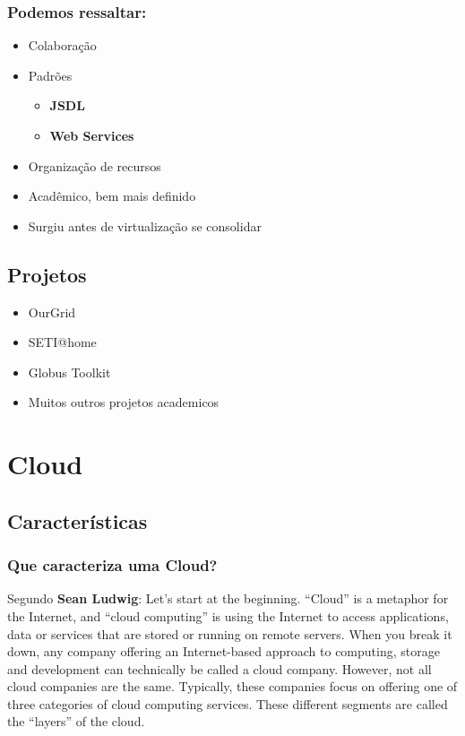\documentclass[10pt]{beamer}
\begin{document}
		\begin{frame}%
		\frametitle{Podemos ressaltar:}
			\begin{itemize}%
				\item Colaboração
				\item Padrões
				\begin{itemize}%
					\item \textbf{JSDL}
					\item \textbf{Web Services}
				\end{itemize}
				\item Organização de recursos
				\item Acadêmico, bem mais definido
				\item Surgiu antes de virtualização se consolidar
			\end{itemize}
		\end{frame}

	\subsection{Projetos}

		\begin{frame}%
			\begin{itemize}%
				\item OurGrid
				\item SETI@home
				\item Globus Toolkit
				\item Muitos outros projetos academicos
			\end{itemize}
		\end{frame}

\section{Cloud}
	\subsection{Características}

		\begin{frame}
		\frametitle{Que caracteriza uma Cloud?}
			\begin{block}{Segundo \textbf{Sean Ludwig}:}
				Let’s start at the beginning. “Cloud” is a metaphor for the Internet, and “cloud computing” is using the Internet to access applications, data or services that are stored or running on remote servers.
\newline
\newline
				When you break it down, any company offering an Internet-based approach to computing, storage and development can technically be called a cloud company. However, not all cloud companies are the same. Typically, these companies focus on offering one of three categories of cloud computing services. These different segments are called the “layers” of the cloud.
			\end{block}
		\end{frame}
\end{document}
